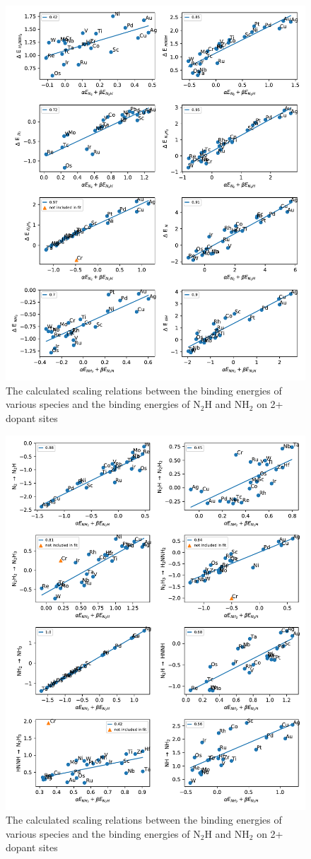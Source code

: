 \begin{figure}
\includegraphics[width=0.8\linewidth]{Images/scaling_species.pdf}
\caption{The calculated scaling relations between the binding energies of various species and the binding energies of N$_2$H and NH$_2$ on 2+ dopant sites}
\end{figure}

\begin{figure}
\centering
\includegraphics[width=0.8\linewidth]{Images/scaling_reactions.pdf}
\caption{The calculated scaling relations between the binding energies of various species and the binding energies of N$_2$H and NH$_2$ on 2+ dopant sites}
\end{figure}

